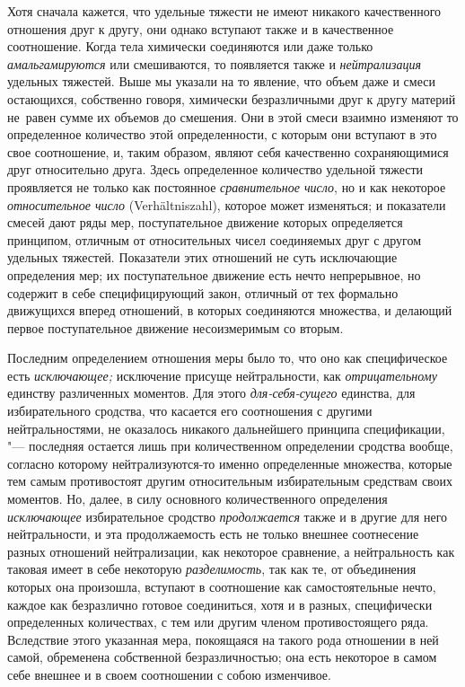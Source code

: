 Хотя сначала кажется, что удельные тяжести не имеют никакого качественного
отношения друг к другу, они однако вступают также и в качественное соотношение.
Когда тела химически соединяются или даже только {\em амальгамируются} или
смешиваются, то появляется также и {\em нейтрализация} удельных тяжестей. Выше
мы указали на то явление, что объем даже и смеси остающихся, собственно говоря,
химически безразличными друг к другу материй не~равен сумме их объемов до
смешения. Они в этой смеси взаимно изменяют то определенное количество этой
определенности, с которым они вступают в это свое соотношение, и, таким
образом, являют себя качественно сохраняющимися друг относительно друга. Здесь
определенное количество удельной тяжести проявляется не только как постоянное
{\em сравнительное число}, но и как некоторое {\em относительное число}
(Ver\-hält\-nis\-zahl), которое может изменяться; и показатели смесей дают ряды
мер, поступательное движение которых определяется принципом, отличным от
относительных чисел соединяемых друг с другом удельных тяжестей. Показатели
этих отношений не суть исключающие определения мер; их поступательное движение
есть нечто непрерывное, но содержит в себе специфицирующий закон, отличный от
тех формально движущихся вперед отношений, в которых соединяются множества, и
делающий первое поступательное движение несоизмеримым со вторым.


Последним определением отношения меры было то, что оно как специфическое есть
{\em исключающее;} исключение присуще нейтральности, как {\em отрицательному}
единству различенных моментов. Для этого {\em для-себя-сущего} единства, для
избирательного сродства, что касается его соотношения с другими
нейтральностями, не оказалось никакого дальнейшего принципа спецификации, "---
последняя остается лишь при количественном определении сродства вообще,
согласно которому нейтрализуются-то именно определенные множества, которые тем
самым противостоят другим относительным избирательным средствам своих моментов.
Но, далее, в силу основного количественного определения {\em исключающее}
избирательное сродство {\em продолжается} также и в другие для него
нейтральности, и эта продолжаемость есть не только внешнее соотнесение разных
отношений нейтрализации, как некоторое сравнение, а нейтральность как таковая
имеет в себе некоторую {\em разделимость}, так как те, от объединения которых
она произошла, вступают в соотношение как самостоятельные нечто, каждое как
безразлично готовое соединиться, хотя и в разных, специфически определенных
количествах, с тем или другим членом противостоящего ряда. Вследствие этого
указанная мера, покоящаяся на такого рода отношении в ней самой, обременена
собственной безразличностью; она есть некоторое в самом себе внешнее и в своем
соотношении с собою изменчивое.

